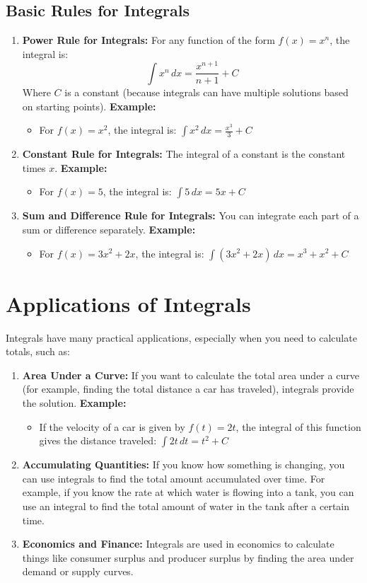 \subsection{Basic Rules for Integrals}
\begin{enumerate}
    \item \textbf{Power Rule for Integrals:} For any function of the form \( f(x) = x^n \), the integral is:
    \[
    \int x^n \, dx = \frac{x^{n+1}}{n+1} + C
    \]
    Where \( C \) is a constant (because integrals can have multiple solutions based on starting points).
    \textbf{Example:}
    \begin{itemize}
        \item For \( f(x) = x^2 \), the integral is: \( \int x^2 \, dx = \frac{x^3}{3} + C \)
    \end{itemize}
    \item \textbf{Constant Rule for Integrals:} The integral of a constant is the constant times \( x \).
    \textbf{Example:}
    \begin{itemize}
        \item For \( f(x) = 5 \), the integral is: \( \int 5 \, dx = 5x + C \)
    \end{itemize}
    \item \textbf{Sum and Difference Rule for Integrals:} You can integrate each part of a sum or difference separately.
    \textbf{Example:}
    \begin{itemize}
        \item For \( f(x) = 3x^2 + 2x \), the integral is: \( \int (3x^2 + 2x) \, dx = x^3 + x^2 + C \)
    \end{itemize}
\end{enumerate}

\section{Applications of Integrals}
Integrals have many practical applications, especially when you need to calculate totals, such as:
\begin{enumerate}
    \item \textbf{Area Under a Curve:} If you want to calculate the total area under a curve (for example, finding the total distance a car has traveled), integrals provide the solution.
    \textbf{Example:}
    \begin{itemize}
        \item If the velocity of a car is given by \( f(t) = 2t \), the integral of this function gives the distance traveled: \( \int 2t \, dt = t^2 + C \)
    \end{itemize}
    \item \textbf{Accumulating Quantities:} If you know how something is changing, you can use integrals to find the total amount accumulated over time. For example, if you know the rate at which water is flowing into a tank, you can use an integral to find the total amount of water in the tank after a certain time.
    \item \textbf{Economics and Finance:} Integrals are used in economics to calculate things like consumer surplus and producer surplus by finding the area under demand or supply curves.
\end{enumerate}

